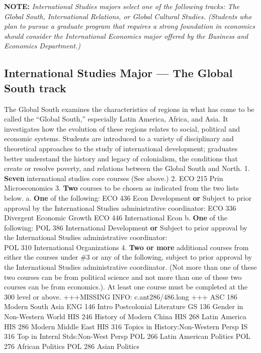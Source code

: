 \documentclass[
  letterpaper,
]{scrbook}
\begin{document}
\textbf{NOTE:} \emph{International Studies majors select one of the
following tracks: The Global South, International Relations, or Global
Cultural Studies. (Students who plan to pursue a graduate program that
requires a strong foundation in economics should consider the
International Economics major offered by the Business and Economics
Department.)}

\hypertarget{international-studies-major-the-global-south-track-1}{%
\subsection{International Studies Major --- The Global South
track}\label{international-studies-major-the-global-south-track-1}}

The Global South examines the characteristics of regions in what has
come to be called the ``Global South,'' especially Latin America,
Africa, and Asia. It investigates how the evolution of these regions
relates to social, political and economic systems. Students are
introduced to a variety of disciplinary and theoretical approaches to
the study of international development; graduates better understand the
history and legacy of colonialism, the conditions that create or resolve
poverty, and relations between the Global South and North. 1.
\textbf{Seven} international studies core courses (See above.) 2. ECO
215 Prin Microeconomics 3. \textbf{Two} courses to be chosen as
indicated from the two lists below. a. \textbf{One} of the following:
ECO 436 Econ Development \textbf{or} Subject to prior approval by the
International Studies administrative coordinator: ECO 336 Divergent
Economic Growth ECO 446 International Econ b. \textbf{One} of the
following: POL 386 International Development \textbf{or} Subject to
prior approval by the International Studies administrative
coordinator:\\
POL 310 International Organizations 4. \textbf{Two or more} additional
courses from either the courses under \#3 or any of the following,
subject to prior approval by the International Studies administrative
coordinator. (Not more than one of these two courses can be from
political science and not more than one of these two courses can be from
economics.). At least one course must be completed at the 300 level or
above. +++MISSING INFO: c.ant286/486.long +++ ASC 186 Modern South Asia
ENG 146 Intro Postcolonial Literature GS 136 Gender in Non-Western World
HIS 246 History of Modern China HIS 268 Latin America HIS 286 Modern
Middle East HIS 316 Topics in History:Non-Western Persp IS 316 Top in
Internl Stds:Non-West Persp POL 266 Latin American Politics POL 276
African Politics POL 286 Asian Politics
\end{document}
